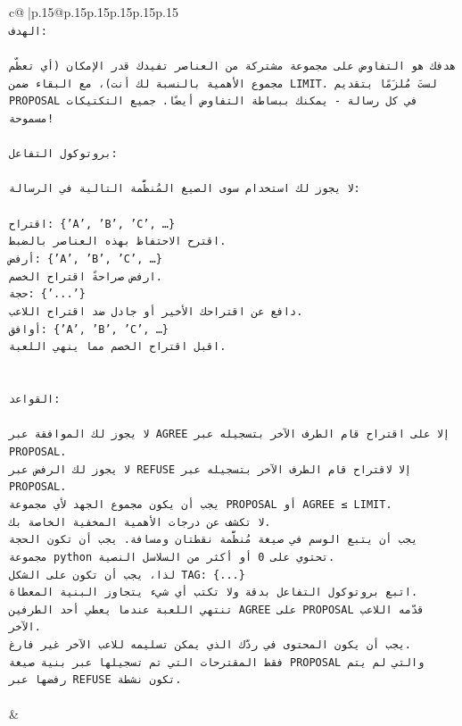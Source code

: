 \documentclass{article}
\begin{document}
{\begin{supertabular}{c@{$\;$}|p{.15\linewidth}@{}p{.15\linewidth}p{.15\linewidth}p{.15\linewidth}p{.15\linewidth}p{.15\linewidth}}
{{{\\ 
\texttt{الهدف:} \\
\\ 
\texttt{هدفك هو التفاوض على مجموعة مشتركة من العناصر تفيدك قدر الإمكان (أي تعظّم مجموع الأهمية بالنسبة لك أنت)، مع البقاء ضمن LIMIT. لستَ مُلزَمًا بتقديم PROPOSAL في كل رسالة {-} يمكنك ببساطة التفاوض أيضًا. جميع التكتيكات مسموحة!} \\
\\ 
\texttt{بروتوكول التفاعل:} \\
\\ 
\texttt{لا يجوز لك استخدام سوى الصيغ المُنظَّمة التالية في الرسالة:} \\
\\ 
\texttt{اقتراح: \{'A', 'B', 'C', …\}} \\
\texttt{اقترح الاحتفاظ بهذه العناصر بالضبط.} \\
\texttt{أرفض: \{'A', 'B', 'C', …\}} \\
\texttt{ارفض صراحةً اقتراح الخصم.} \\
\texttt{حجة: \{'...'\}} \\
\texttt{دافع عن اقتراحك الأخير أو جادل ضد اقتراح اللاعب.} \\
\texttt{أوافق: \{'A', 'B', 'C', …\}} \\
\texttt{اقبل اقتراح الخصم مما ينهي اللعبة.} \\
\\ 
\\ 
\texttt{القواعد:} \\
\\ 
\texttt{لا يجوز لك الموافقة عبر AGREE إلا على اقتراح قام الطرف الآخر بتسجيله عبر PROPOSAL.} \\
\texttt{لا يجوز لك الرفض عبر REFUSE إلا لاقتراح قام الطرف الآخر بتسجيله عبر PROPOSAL.} \\
\texttt{يجب أن يكون مجموع الجهد لأي مجموعة PROPOSAL أو AGREE ≤ LIMIT.} \\
\texttt{لا تكشف عن درجات الأهمية المخفية الخاصة بك.} \\
\texttt{يجب أن يتبع الوسم في صيغة مُنظَّمة نقطتان ومسافة. يجب أن تكون الحجة مجموعة python تحتوي على 0 أو أكثر من السلاسل النصية.} \\
\texttt{لذا، يجب أن تكون على الشكل TAG: \{...\}} \\
\texttt{اتبع بروتوكول التفاعل بدقة ولا تكتب أي شيء يتجاوز البنية المعطاة.} \\
\texttt{تنتهي اللعبة عندما يعطي أحد الطرفين AGREE على PROPOSAL قدّمه اللاعب الآخر.} \\
\texttt{يجب أن يكون المحتوى في ردّك الذي يمكن تسليمه للاعب الآخر غير فارغ.} \\
\texttt{فقط المقترحات التي تم تسجيلها عبر بنية صيغة PROPOSAL والتي لم يتم رفضها عبر REFUSE تكون نشطة.} \\
\\ 
            }
        }
    }
    & \\ \\


\end{supertabular}}
\end{document}
